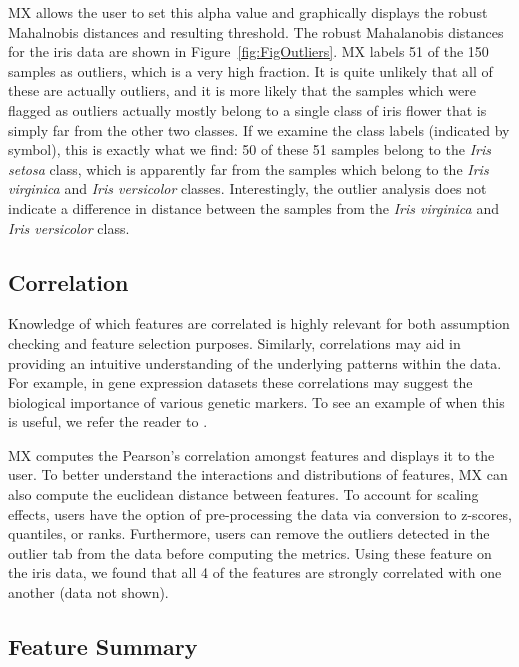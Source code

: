 \documentclass[twoside,leqno,twocolumn]{article}
\begin{document}
MX allows the user to set this alpha value and graphically displays the robust Mahalnobis distances and resulting threshold. The robust Mahalanobis distances for the iris data are shown in Figure~\ref{fig:FigOutliers}. MX labels 51 of the 150 samples as outliers, which is a very high fraction. It is quite unlikely that all of these are actually outliers, and it is more likely that the samples which were flagged as outliers actually mostly belong to a single class of iris flower that is simply far from the other two classes. If we examine the class labels (indicated by symbol), this is exactly what we find: 50 of these 51 samples belong to the \textit{Iris setosa} class, which is apparently  far from the samples which belong to the \textit{Iris virginica} and \textit{Iris versicolor} classes. Interestingly, the outlier analysis does not indicate a difference in distance between the samples from the \textit{Iris virginica} and \textit{Iris versicolor} class. 

\subsection{Correlation}
\label{subsec:SubSecCorrelation}

Knowledge of which features are correlated is highly relevant for both assumption checking and feature selection purposes. Similarly, correlations may aid in providing an intuitive understanding of the underlying patterns within the data. For example, in gene expression datasets these correlations may suggest the biological importance of various genetic markers. To see an example of when this is useful, we refer the reader to \cite{shi2012unsupervised}.

MX computes the Pearson's correlation amongst features and displays it to the user. To better understand the interactions and distributions of features, MX can also compute the euclidean distance between features. To account for scaling effects, users have the option of pre-processing the data via conversion to z-scores, quantiles, or ranks. Furthermore, users can remove the outliers detected in the outlier tab from the data before computing the metrics. Using these feature on the iris data, we found that all 4 of the features are strongly correlated with one another (data not shown).

\subsection{Feature Summary}
\label{subsec:SubSecFeature}
\end{document}
